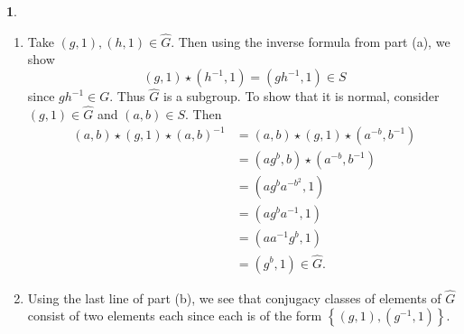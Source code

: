 \documentclass[12pt]{article}
\theoremstyle{definition}
\newtheorem{ex}{}
\newenvironment{exercise}[1]{
	\renewcommand{\theex}{#1}
	\begin{ex}
		}{\end{ex}}
\begin{document}
\begin{exercise}{6}
\begin{enumerate}[label=(\alph*)]
\begin{align*}
		      \end{align*}
		\item Take $(g, 1), (h, 1) \in \widehat{G}$.
		      Then using the inverse formula from part (a), we show \begin{equation*}
			      (g, 1) \star (h^{-1}, 1) = (gh^{-1}, 1) \in S
		      \end{equation*}
		      since $gh^{-1} \in G$.
		      Thus $\widehat{G}$ is a subgroup.
		      To show that it is normal, consider $(g, 1) \in \widehat{G}$ and $(a, b) \in S$.
		      Then \begin{align*}
			      (a, b) \star (g, 1) \star (a, b)^{-1} & = (a, b) \star (g, 1) \star (a^{-b}, b^{-1}) \\
			                                            & = (ag^{b}, b) \star (a^{-b}, b^{-1})         \\
			                                            & = (ag^ba^{-b^2}, 1)                          \\
			                                            & = (ag^ba^{-1}, 1)                            \\
			                                            & = (aa^{-1}g^b, 1)                            \\
			                                            & = (g^b, 1) \in \widehat{G}.
		      \end{align*}
		\item Using the last line of part (b), we see that conjugacy classes of elements of $\widehat{G}$ consist of two elements each since each is of the form $\left\lbrace (g, 1), (g^{-1}, 1) \right\rbrace$.
	\end{enumerate}
\end{exercise}
\end{document}

